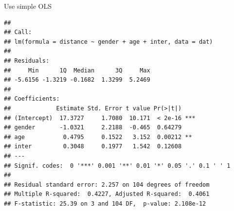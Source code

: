 \documentclass[ignorenonframetext,]{beamer}
\newenvironment{Shaded}{\begin{snugshade}}{\end{snugshade}}
\newcommand{\KeywordTok}[1]{\textcolor[rgb]{0.13,0.29,0.53}{\textbf{#1}}}
\newcommand{\DataTypeTok}[1]{\textcolor[rgb]{0.13,0.29,0.53}{#1}}
\newcommand{\StringTok}[1]{\textcolor[rgb]{0.31,0.60,0.02}{#1}}
\newcommand{\CommentTok}[1]{\textcolor[rgb]{0.56,0.35,0.01}{\textit{#1}}}
\newcommand{\OperatorTok}[1]{\textcolor[rgb]{0.81,0.36,0.00}{\textbf{#1}}}
\newcommand{\NormalTok}[1]{#1}
\begin{document}
\begin{frame}[fragile]{Use simple OLS}

\tiny

\begin{Shaded}
\end{Shaded}

\begin{verbatim}
## 
## Call:
## lm(formula = distance ~ gender + age + inter, data = dat)
## 
## Residuals:
##     Min      1Q  Median      3Q     Max 
## -5.6156 -1.3219 -0.1682  1.3299  5.2469 
## 
## Coefficients:
##             Estimate Std. Error t value Pr(>|t|)    
## (Intercept)  17.3727     1.7080  10.171  < 2e-16 ***
## gender       -1.0321     2.2188  -0.465  0.64279    
## age           0.4795     0.1522   3.152  0.00212 ** 
## inter         0.3048     0.1977   1.542  0.12608    
## ---
## Signif. codes:  0 '***' 0.001 '**' 0.01 '*' 0.05 '.' 0.1 ' ' 1
## 
## Residual standard error: 2.257 on 104 degrees of freedom
## Multiple R-squared:  0.4227, Adjusted R-squared:  0.4061 
## F-statistic: 25.39 on 3 and 104 DF,  p-value: 2.108e-12
\end{verbatim}

\end{frame}
\end{document}
